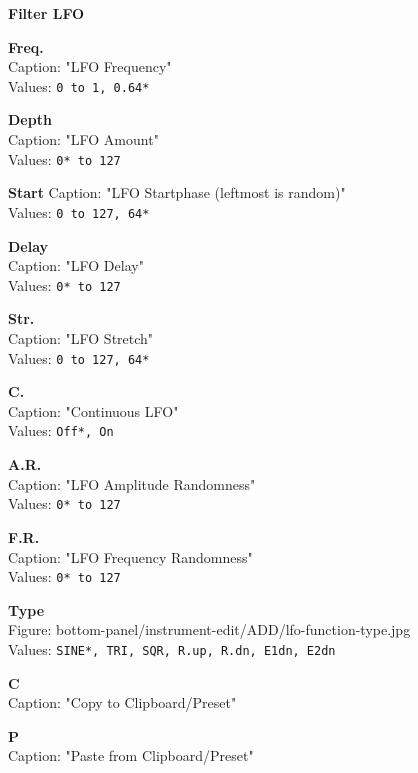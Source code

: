 \documentclass[
 11pt,
 twoside,
 a4paper,
 headinclude,
 footinclude,
 final                                 %
]{article}
\begin{document}
\begin{enumber}
\begin{enumber}
\begin{enumber}
\begin{enumber}
            \item \textbf{Filter LFO}
            \begin{enumber}
               \item \textbf{Freq.} \\
                  Caption: "LFO Frequency" \\
                  Values: \texttt{0 to 1, 0.64*}
               \item \textbf{Depth} \\
                  Caption: "LFO Amount" \\
                  Values: \texttt{0* to 127}
               \item \textbf{Start}
                  Caption: "LFO Startphase (leftmost is random)" \\
                  Values: \texttt{0 to 127, 64*}
               \item \textbf{Delay} \\
                  Caption: "LFO Delay" \\
                  Values: \texttt{0* to 127}
               \item \textbf{Str.} \\
                  Caption: "LFO Stretch" \\
                  Values: \texttt{0 to 127, 64*}
               \item \textbf{C.} \\
                  Caption: "Continuous LFO" \\
                  Values: \texttt{Off*, On}
               \item \textbf{A.R.} \\
                  Caption: "LFO Amplitude Randomness" \\
                  Values: \texttt{0* to 127}
               \item \textbf{F.R.} \\
                  Caption: "LFO Frequency Randomness" \\
                  Values: \texttt{0* to 127}
               \item \textbf{Type} \\
                  Figure: bottom-panel/instrument-edit/ADD/lfo-function-type.jpg \\
                  Values: \texttt{SINE*, TRI, SQR, R.up, R.dn, E1dn, E2dn}
               \item \textbf{C} \\
                  Caption: "Copy to Clipboard/Preset"
               \item \textbf{P} \\
                  Caption: "Paste from Clipboard/Preset"
            \end{enumber}
         \end{enumber}


\end{enumber}
\end{enumber}
\end{enumber}
\end{document}
